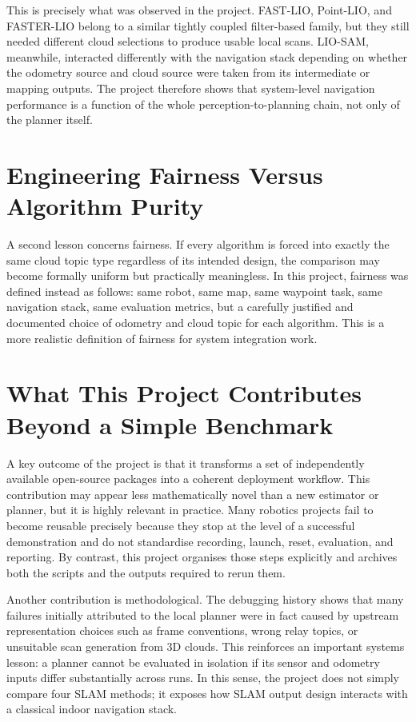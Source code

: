 \documentclass[12pt,a4paper]{report}
\begin{document}
This is precisely what was observed in the project. FAST-LIO, Point-LIO, and FASTER-LIO belong to a similar tightly coupled filter-based family, but they still needed different cloud selections to produce usable local scans. LIO-SAM, meanwhile, interacted differently with the navigation stack depending on whether the odometry source and cloud source were taken from its intermediate or mapping outputs. The project therefore shows that system-level navigation performance is a function of the whole perception-to-planning chain, not only of the planner itself.

\section{Engineering Fairness Versus Algorithm Purity}
A second lesson concerns fairness. If every algorithm is forced into exactly the same cloud topic type regardless of its intended design, the comparison may become formally uniform but practically meaningless. In this project, fairness was defined instead as follows: same robot, same map, same waypoint task, same navigation stack, same evaluation metrics, but a carefully justified and documented choice of odometry and cloud topic for each algorithm. This is a more realistic definition of fairness for system integration work.

\section{What This Project Contributes Beyond a Simple Benchmark}
A key outcome of the project is that it transforms a set of independently available open-source packages into a coherent deployment workflow. This contribution may appear less mathematically novel than a new estimator or planner, but it is highly relevant in practice. Many robotics projects fail to become reusable precisely because they stop at the level of a successful demonstration and do not standardise recording, launch, reset, evaluation, and reporting. By contrast, this project organises those steps explicitly and archives both the scripts and the outputs required to rerun them.

Another contribution is methodological. The debugging history shows that many failures initially attributed to the local planner were in fact caused by upstream representation choices such as frame conventions, wrong relay topics, or unsuitable scan generation from 3D clouds. This reinforces an important systems lesson: a planner cannot be evaluated in isolation if its sensor and odometry inputs differ substantially across runs. In this sense, the project does not simply compare four SLAM methods; it exposes how SLAM output design interacts with a classical indoor navigation stack.
\end{document}
